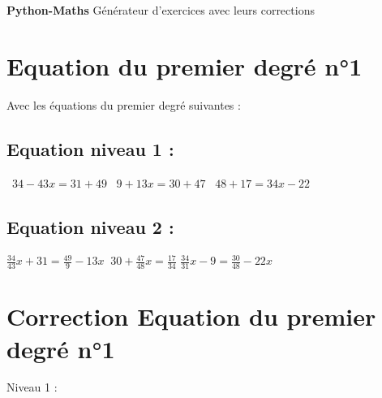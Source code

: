 \documentclass{article}%
\begin{document}
%
\normalsize%
\pagestyle{header}%
\begin{minipage}{\textwidth}%
\centering%
\vspace*{200pt}%
\fontsize{50}{36}%
\selectfont%
\textbf{Python{-}Maths}%
\linebreak%
\fontsize{30}{24}%
\selectfont%
Générateur d'exercices avec leurs corrections%
\end{minipage}%
\newpage%
\fontsize{12}{10}%
\selectfont%
\section*{Equation du premier degré n°1}%
\label{sec:Equationdupremierdegrn1}%
Avec les équations du premier degré suivantes : %
\subsection*{Equation niveau 1 : }%
\label{subsec:Equationniveau1}%
\ $34 - 43x = 31 + 49 $%
\vspace{5mm}%
\newline%
\ $9 + 13x  = 30 + 47$%
\vspace{5mm}%
\newline%
\ $48 + 17 = 34x - 22$

%
\subsection*{Equation niveau 2 : }%
\label{subsec:Equationniveau2}%
$\frac{34}{43}x + 31 = \frac{49}{9} - 13x$%
\vspace{5mm}%
\newline%
$\ 30 + \frac{47}{48}x = \frac{17}{34}$%
\vspace{5mm}%
\newline%
$\frac{34}{31}x - 9 = \frac{30}{48} - 22x$%
\vspace{5mm}%
\newline

%
\newpage%
\section*{Correction Equation du premier degré n°1}%
\label{sec:CorrectionEquationdupremierdegrn1}%
Niveau 1 :%
\end{document}
